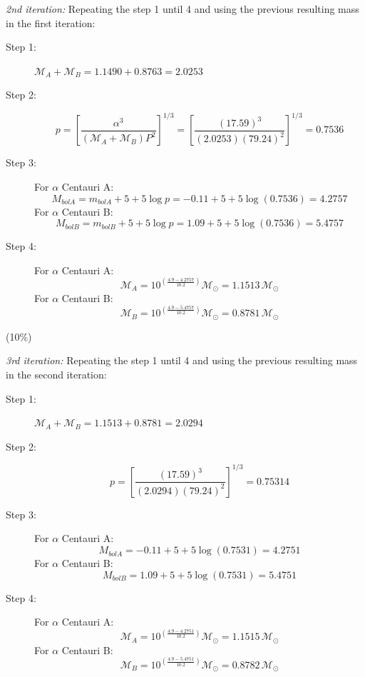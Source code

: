 \begin{description}
  \emph{2nd iteration:} Repeating the step 1 until 4 and using the previous
  resulting mass in the first iteration:
  \begin{description}
  \item[Step 1:] $\mathcal{M}_A + \mathcal{M}_B = 1.1490 + 0.8763 = 2.0253$
  \item[Step 2:]
    \[ p = \left[ \frac{\alpha^3}{(\mathcal{M}_A + \mathcal{M}_B) P^2}
           \right]^{1/3}
         = \left[ \frac{(17.59)^3}{(2.0253)(79.24)^2} \right]^{1/3}
         = 0.7536 \]
  \item[Step 3:] For $\alpha$ Centauri A:
    \[ M_{bolA} = m_{bolA} + 5 + 5\log p
       = -0.11 + 5 + 5\log(0.7536) = 4.2757 \]
    For $\alpha$ Centauri B:
    \[ M_{bolB} = m_{bolB} + 5 + 5\log p
       = 1.09 + 5 + 5\log(0.7536) = 5.4757 \]
  \item[Step 4:] For $\alpha$ Centauri A:
    \[ \mathcal{M}_A
       = 10^{\left( \frac{4.9 - 4.2757}{10.2} \right)} \mathcal{M}_\odot
       = 1.1513\,\mathcal{M}_\odot \]
    For $\alpha$ Centauri B:
    \[ \mathcal{M}_B
       = 10^{\left( \frac{4.9 - 5.4757}{10.2} \right)} \mathcal{M}_\odot
       = 0.8781\,\mathcal{M}_\odot \]
  \end{description}
  \hfill(10\%)

  \emph{3rd iteration:} Repeating the step 1 until 4 and using the previous
  resulting mass in the second iteration:
  \begin{description}
  \item[Step 1:] $\mathcal{M}_A + \mathcal{M}_B = 1.1513 + 0.8781 = 2.0294$
  \item[Step 2:]
    \[ p = \left[ \frac{(17.59)^3}{(2.0294)(79.24)^2} \right]^{1/3}
         = 0.75314 \]
  \item[Step 3:] For $\alpha$ Centauri A:
    \[ M_{bolA} = -0.11 + 5 + 5\log(0.7531) = 4.2751 \]
    For $\alpha$ Centauri B:
    \[ M_{bolB} = 1.09 + 5 + 5\log(0.7531) = 5.4751 \]
  \item[Step 4:] For $\alpha$ Centauri A:
    \[ \mathcal{M}_A
       = 10^{\left( \frac{4.9 - 4.2751}{10.2} \right)} \mathcal{M}_\odot
       = 1.1515\,\mathcal{M}_\odot \]
    For $\alpha$ Centauri B:
    \[ \mathcal{M}_B
       = 10^{\left( \frac{4.9 - 5.4751}{10.2} \right)} \mathcal{M}_\odot
       = 0.8782\,\mathcal{M}_\odot \]
  \end{description}


\end{description}
